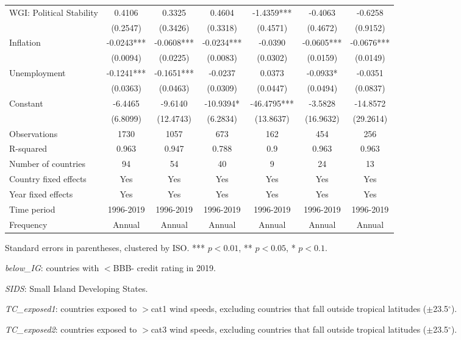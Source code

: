 \documentclass[10pt]{article}
\begin{document}
\begin{table}[h!]
\begin{threeparttable}
\begin{tabular}{lcccccc}
    WGI: Political Stability & 0.4106 & 0.3325 & 0.4604 & -1.4359*** & -0.4063 & -0.6258 \\
     & (0.2547) & (0.3426) & (0.3318) & (0.4571) & (0.4672) & (0.9152) \\[2pt]
    Inflation & -0.0243*** & -0.0608*** & -0.0234*** & -0.0390 & -0.0605*** & -0.0676*** \\
     & (0.0094) & (0.0225) & (0.0083) & (0.0302) & (0.0159) & (0.0149) \\[2pt]
    Unemployment & -0.1241*** & -0.1651*** & -0.0237 & 0.0373 & -0.0933* & -0.0351 \\
     & (0.0363) & (0.0463) & (0.0309) & (0.0447) & (0.0494) & (0.0837) \\[2pt]
    \midrule
    Constant & -6.4465 & -9.6140 & -10.9394* & -46.4795*** & -3.5828 & -14.8572 \\
     & (6.8099) & (12.4743) & (6.2834) & (13.8637) & (16.9632) & (29.2614) \\[2pt]
    \midrule
    Observations & 1730 & 1057 & 673 & 162 & 454 & 256 \\
    R-squared & 0.963 & 0.947 & 0.788 & 0.9 & 0.963 & 0.963 \\
    Number of countries & 94 & 54 & 40 & 9 & 24 & 13 \\
    Country fixed effects & Yes & Yes & Yes & Yes & Yes & Yes \\
    Year fixed effects & Yes & Yes & Yes & Yes & Yes & Yes \\
    Time period & 1996-2019 & 1996-2019 & 1996-2019 & 1996-2019 & 1996-2019 & 1996-2019 \\
    Frequency & Annual & Annual & Annual & Annual & Annual & Annual \\
    \bottomrule
  \end{tabular}
  \begin{tablenotes}
    \footnotesize
    \item Standard errors in parentheses, clustered by ISO. *** $p<0.01$, ** $p<0.05$, * $p<0.1$.
    \item \textit{below\_IG}: countries with $<$BBB- credit rating in 2019.
    \item \textit{SIDS}: Small Island Developing States.
    \item \textit{TC\_exposed1}: countries exposed to $>$cat1 wind speeds, excluding countries that fall outside tropical latitudes ($\pm$23.5$^\circ$).
    \item \textit{TC\_exposed2}: countries exposed to $>$cat3 wind speeds, excluding countries that fall outside tropical latitudes ($\pm$23.5$^\circ$).
  \end{tablenotes}
  \end{threeparttable}
\end{table}
\end{document}
